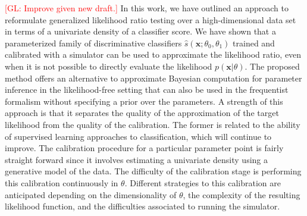 \documentclass[12pt]{article}
\numberwithin{equation}{section}
\theoremstyle{plain}
\newcommand{\glnote}[1]{\textcolor{red}{[GL: #1]}}
\begin{document}
\glnote{Improve given new draft.}
In this work, we have outlined an approach to reformulate generalized likelihood
ratio testing over a high-dimensional data set in terms of a univariate density
of a classifier score. We have shown that a parameterized family of
discriminative classifiers $\hat s(\mathbf{x}; \theta_0, \theta_1)$ trained and
calibrated with a simulator can be used to approximate the likelihood ratio,
even when it is not possible to directly evaluate the likelihood
$p(\mathbf{x}|\theta)$.
The proposed method offers an alternative to approximate Bayesian computation
for parameter inference in the likelihood-free setting that can also be used in
the frequentist formalism without specifying a prior over the parameters. A
strength of this approach is that it separates the quality of the approximation
of the target likelihood from the quality of the calibration. The former is
related to the ability of supervised learning approaches to  classification,
which will continue to improve. The calibration procedure for a particular
parameter point is fairly straight forward since it involves estimating a
univariate density using a generative model of the data. The difficulty of the
calibration stage is performing this calibration continuously in $\theta$.
Different strategies to this calibration are anticipated depending on the
dimensionality of $\theta$, the complexity of the resulting likelihood function,
and the difficulties associated to running the simulator.



\end{document}
